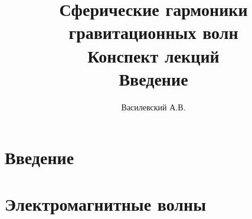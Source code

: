 \documentclass[12pt,a5paper]{article}
\title{Сферические гармоники гравитационных волн\\ Конспект лекций\\ Введение}
\author{Василевский А.В.}
\def\docroot{../..}
\begin{document}
    \makedocroot

    \maketitle
    \tableofcontents

    \section{Введение}
    

    \section{Электромагнитные волны}
    

    \begin{appendix}

    \end{appendix}

    \clearpage

    \nocite{sivuhin_elect}
    
    
\end{document}
